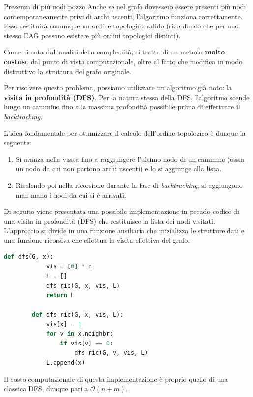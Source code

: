 \documentclass[12pt]{report}
\begin{document}
	\begin{osservazione}{Presenza di più nodi pozzo}{}
		Anche se nel grafo dovessero essere presenti più nodi contemporaneamente privi di archi uscenti, l'algoritmo funziona correttamente. Esso restituirà comunque un ordine topologico valido (ricordando che per uno stesso DAG possono esistere più ordini topologici distinti).
	\end{osservazione}
	
	Come si nota dall'analisi della complessità, si tratta di un metodo \textbf{molto costoso} dal punto di vista computazionale, oltre al fatto che modifica in modo distruttivo la struttura del grafo originale.
	
	Per risolvere questo problema, possiamo utilizzare un algoritmo già noto: la \textbf{visita in profondità (DFS)}. Per la natura stessa della DFS, l'algoritmo scende lungo un cammino fino alla massima profondità possibile prima di effettuare il \textit{backtracking}.
	
	L'idea fondamentale per ottimizzare il calcolo dell'ordine topologico è dunque la seguente:
	\begin{enumerate}
		\item Si avanza nella visita fino a raggiungere l'ultimo nodo di un cammino (ossia un nodo da cui non partono archi uscenti) e lo si aggiunge alla lista.
		
		\item Risalendo poi nella ricorsione durante la fase di \textit{backtracking}, si aggiungono man mano i nodi da cui si è arrivati.
	\end{enumerate}
	
	Di seguito viene presentata una possibile implementazione in pseudo-codice di una visita in profondità (DFS) che restituisce la lista dei nodi visitati. L'approccio si divide in una funzione ausiliaria che inizializza le strutture dati e una funzione ricorsiva che effettua la visita effettiva del grafo.
	
	\begin{lstlisting}[language=Python]
		def dfs(G, x):
			vis = [0] * n
			L = []
			dfs_ric(G, x, vis, L)
			return L
			
		def dfs_ric(G, x, vis, L):
			vis[x] = 1
			for v in x.neighbr:
				if vis[v] == 0:
					dfs_ric(G, v, vis, L)
			L.append(x)
	\end{lstlisting}
	
	Il costo computazionale di questa implementazione è proprio quello di una classica DFS, dunque pari a $\mathcal{O}(n + m)$.
	
\end{document}
